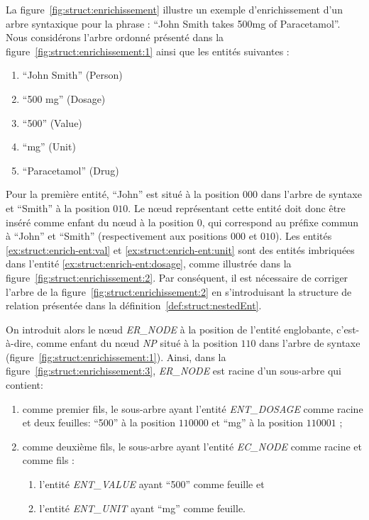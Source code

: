 \begin{example}
    La figure~\ref{fig:struct:enrichissement} illustre un exemple d'enrichissement d'un arbre syntaxique pour la phrase : \enquote{John Smith takes 500mg of Paracetamol}.
    Nous considérons l'arbre ordonné présenté dans la figure~\ref{fig:struct:enrichissement:1} ainsi que les entités suivantes :
    \begin{multicols}{3}
        \begin{enumerate}
            \item \enquote{John Smith} (Person) \label{ex:struct:enrich-ent:person}
            \item \enquote{500 mg} (Dosage) \label{ex:struct:enrich-ent:dosage}
            \item \enquote{500} (Value) \label{ex:struct:enrich-ent:val}
            \item \enquote{mg} (Unit) \label{ex:struct:enrich-ent:unit}
            \item \enquote{Paracetamol} (Drug) \label{ex:struct:enrich-ent:drug}
        \end{enumerate}
    \end{multicols}

    Pour la première entité, \enquote{John} est situé à la position $000$ dans l'arbre de syntaxe et \enquote{Smith} à la position $010$.
    Le nœud représentant cette entité doit donc être inséré comme enfant du nœud à la position $0$, qui correspond au préfixe commun à \enquote{John} et \enquote{Smith} (respectivement aux positions $000$ et $010$).
    Les entités \ref{ex:struct:enrich-ent:val} et \ref{ex:struct:enrich-ent:unit} sont des entités imbriquées dans l'entité \ref{ex:struct:enrich-ent:dosage}, comme illustrée dans la figure~\ref{fig:struct:enrichissement:2}.
    Par conséquent, il est nécessaire de corriger l'arbre de la figure~\ref{fig:struct:enrichissement:2} en s'introduisant la structure de relation présentée dans la définition~\ref{def:struct:nestedEnt}.

    On introduit alors le nœud \emph{ER\_NODE} à la position de l'entité englobante, c'est-à-dire, comme enfant du nœud \emph{NP} situé à la position $110$ dans l'arbre de syntaxe (figure~\ref{fig:struct:enrichissement:1}).
    Ainsi, dans la figure~\ref{fig:struct:enrichissement:3}, \emph{ER\_NODE} est racine d'un sous-arbre qui contient:
    \begin{enumerate}
        \item comme premier fils, le sous-arbre ayant l'entité \emph{ENT\_DOSAGE} comme racine et deux feuilles: \enquote{500} à la position $110000$ et \enquote{mg} à la position $110001$ ;
        \item comme deuxième fils, le sous-arbre ayant l'entité \emph{EC\_NODE} comme racine et comme fils :
              \begin{enumerate}
                  \item l'entité \emph{ENT\_VALUE} ayant \enquote{500} comme feuille et
                  \item l'entité \emph{ENT\_UNIT} ayant \enquote{mg} comme feuille.
              \end{enumerate}
    \end{enumerate}


\end{example}
